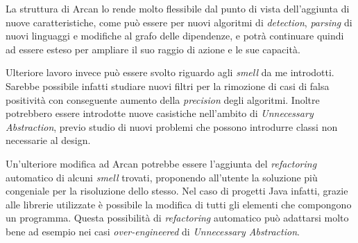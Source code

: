La struttura di Arcan lo rende molto flessibile dal punto di vista dell'aggiunta di nuove caratteristiche, come può essere per nuovi algoritmi di \textit{detection}, \textit{parsing} di nuovi linguaggi e modifiche al grafo delle dipendenze, e potrà continuare quindi ad essere esteso per ampliare il suo raggio di azione e le sue capacità. %

Ulteriore lavoro invece può essere svolto riguardo agli \textit{smell} da me introdotti. Sarebbe possibile infatti studiare nuovi filtri per la rimozione di casi di falsa positività con conseguente aumento della \textit{precision} degli algoritmi. Inoltre potrebbero essere introdotte nuove casistiche nell'ambito di \textit{Unnecessary Abstraction}, previo studio di nuovi problemi che possono introdurre classi non necessarie al design.

Un'ulteriore modifica ad Arcan potrebbe essere l'aggiunta del \textit{refactoring} automatico di alcuni \textit{smell} trovati, proponendo all'utente la soluzione più congeniale per la risoluzione dello stesso. 
Nel caso di progetti Java infatti, grazie alle librerie utilizzate è possibile la modifica di tutti gli elementi che compongono un programma. Questa possibilità di \textit{refactoring} automatico può adattarsi molto bene ad esempio nei casi \textit{over-engineered} di \textit{Unnecessary Abstraction}.
